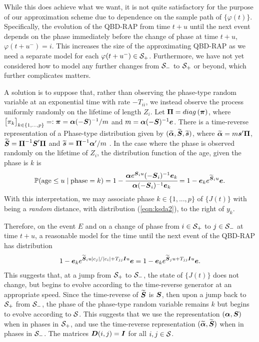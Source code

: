 While this does achieve what we want, it is not quite satisfactory for the purpose of our approximation scheme due to dependence on the sample path of \(\{\varphi(t)\}\). Specifically, the evolution of the QBD-RAP from time \(t+u\) until the next event depends on the phase immediately before the change of phase at time \(t+u\), \(\varphi(t+u^-)=i\). This increases the size of the approximating QBD-RAP as we need a separate model for each \(\varphi(t+u^-)\in\mathcal{S}_+\). Furthermore, we have not yet considered how to model any further changes from \(\mathcal{S}_-\) to \(\mathcal{S}_+\) or beyond, which further complicates matters. 

A solution is to suppose that, rather than observing the phase-type random variable at an exponential time with rate \(-T_{ii}\), we instead observe the process uniformly randomly on the lifetime of length \(Z_i\). Let \(\boldsymbol \Pi = diag\left(\boldsymbol \pi \right)\), where \(\begin{bmatrix} \pi_k \end{bmatrix}_{k\in\{1,\dots,p\}}=:\boldsymbol \pi=\boldsymbol \alpha (-\boldsymbol{S})^{-1}/m\) and \(m=\boldsymbol \alpha (-\boldsymbol{S})^{-1}\boldsymbol e\). There is a time-reverse representation of a Phase-type distribution given by \((\widetilde{\boldsymbol \alpha}, \widetilde{\boldsymbol S}, \widetilde{\boldsymbol s})\), where \(\widetilde{\boldsymbol \alpha} = m\boldsymbol s' \boldsymbol \Pi \), \(\widetilde{\boldsymbol S} = \boldsymbol\Pi^{-1}\boldsymbol S'\boldsymbol \Pi\) and \(\widetilde{\boldsymbol s} = \boldsymbol \Pi^{-1}\boldsymbol \alpha'/m\) \cite[Page 91]{a2008}. In the case where the phase is observed randomly on the lifetime of \(Z_i\), the distribution function of the age, given the phase is \(k\) is \cite[Lemma 3.1]{hmp2017}
\begin{align}\mathbb P(\mbox{age}\leq u \mid \mbox{phase}=k) = 1-\cfrac{\boldsymbol \alpha e^{\boldsymbol S_iu}(-\boldsymbol S_i)^{-1}\boldsymbol e_k}{\boldsymbol \alpha (-\boldsymbol S_i)^{-1}\boldsymbol e_k} = 1- \boldsymbol e_k e^{\widetilde{ \boldsymbol S}_iu}\boldsymbol e.\label{eqn:ksda2}\end{align}
With this interpretation, we may associate phase \(k\in\{1,...,p\}\) of \(\{J(t)\}\) with being a \emph{random} distance, with distribution (\ref{eqn:ksda2}), to the right of \(y_k\).

Therefore, on the event \(E\) and on a change of phase from \(i\in\mathcal{S}_+\) to \(j\in\mathcal{S}_-\) at time \(t+u\), a reasonable model for the time until the next event of the QBD-RAP has distribution 
\begin{align}
	1- \boldsymbol e_k e^{\widetilde{ \boldsymbol S}_iu|c_j|/|c_i| + T_{jj}\boldsymbol Iu}\boldsymbol e = 1- \boldsymbol e_k e^{\widetilde{ \boldsymbol S}_ju+ T_{jj}\boldsymbol Iu}\boldsymbol e.\label{eqn:ksda3}
\end{align}
This suggests that, at a jump from \(\mathcal{S}_+\) to \(\mathcal{S}_-\), the state of \(\{J(t)\}\) does not change, but begins to evolve according to the time-reverse generator at an appropriate speed. Since the time-reverse of \(\widetilde{\boldsymbol S}\) is \(\boldsymbol S\), then upon a jump back to \(\mathcal{S}_+\) from \(\mathcal{S}_-\), the phase of the phase-type random variable remains \(k\) but begins to evolve according to \(\mathcal{S}\). This suggests that we use the representation \((\boldsymbol \alpha, \boldsymbol S)\) when in phases in \(\mathcal{S}_+\), and use the time-reverse representation \((\widetilde{\boldsymbol \alpha}, \widetilde{\boldsymbol S})\) when in phases in \(\mathcal{S}_-\). The matrices \(\boldsymbol D(i,j)=\boldsymbol I\) for all \(i,j\in\mathcal{S}\). 

